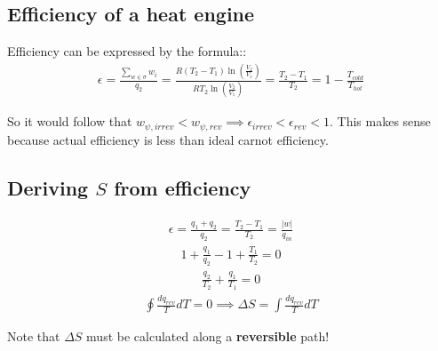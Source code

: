 \documentclass[12pt]{book}
\begin{document}
\subsection*{Efficiency of a heat engine}
Efficiency can be expressed by the formula::
\begin{align*}
    \epsilon=\frac{\sum_{w\in \sigma}w_i}{q_2}=\frac{R(T_2-T_1)\ln\left(\frac{V_2}{V_1}\right)}{RT_2\ln\left(\frac{V_2}{V_1}\right)}=\frac{T_2-T_1}{T_2}=1-\frac{T_{cold}}{T_{hot}}
\end{align*}

So it would follow that $w_{\psi,irrev}<w_{\psi,rev}\implies \epsilon_{irrev}<\epsilon_{rev}<1$. This makes sense because actual efficiency is less than ideal carnot efficiency.

\subsection*{Deriving $S$ from efficiency}

\begin{align*}
    \epsilon=\frac{q_1+q_2}{q_2}=\frac{T_2-T_1}{T_2}=\frac{|w|}{q_{in}}
\end{align*}
\begin{align*}
    1+\frac{q_1}{q_2}-1+\frac{T_1}{T_2}=0
\end{align*}
\begin{align*}
    \frac{q_2}{T_2}+\frac{q_1}{T_1}=0
\end{align*}
\begin{align*}
    \oint \frac{dq_{rev}}{T}dT=0\implies \Delta S=\int \frac{dq_{rev}}{T}dT
\end{align*}

Note that $\Delta S$ must be calculated along a \textbf{reversible} path!
\end{document}
